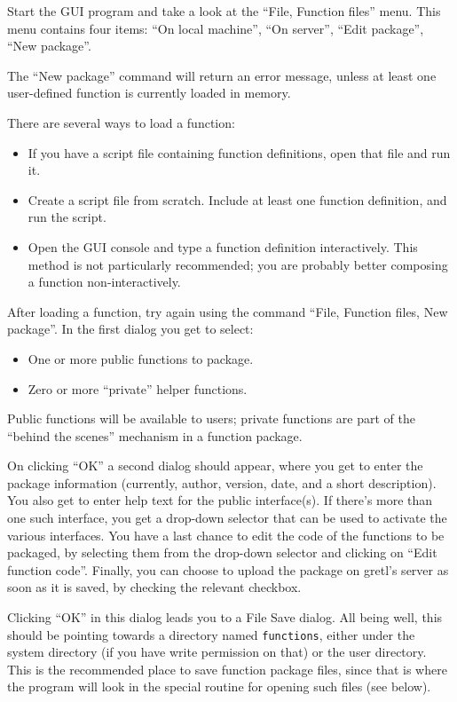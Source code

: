 Start the GUI program and take a look at the ``File, Function files'' menu.
This menu contains four items: ``On local machine'', ``On server'', ``Edit
package'', ``New package''.

The ``New package'' command will return an error message, unless at least one
user-defined function is currently loaded in memory.

There are several ways to load a function:

\begin{itemize}
\item If you have a script file containing function definitions, open
  that file and run it.
\item Create a script file from scratch.  Include at least one
  function definition, and run the script.
\item Open the GUI console and type a function definition
  interactively.  This method is not particularly recommended; you are
  probably better composing a function non-interactively.
\end{itemize}

After loading a function, try again using the command ``File, Function
files, New package''. In the first dialog you get to select:

\begin{itemize}
\item One or more public functions to package.
\item Zero or more ``private'' helper functions.
\end{itemize}

Public functions will be available to users; private functions are
part of the ``behind the scenes'' mechanism in a function package.

On clicking ``OK'' a second dialog should appear, where you get to
enter the package information (currently, author, version, date, and a
short description).  You also get to enter help text for the public
interface(s).  If there's more than one such interface, you get a
drop-down selector that can be used to activate the various interfaces.  
You have a last chance to edit the code of the functions to be
packaged, by selecting them from the drop-down selector and clicking on
``Edit function code''. Finally, you can choose to upload the package on
gretl's server as soon as it is saved, by checking the relevant checkbox.

Clicking ``OK'' in this dialog leads you to a File Save dialog.  All
being well, this should be pointing towards a directory named
\texttt{functions}, either under the  system directory (if
you have write permission on that) or the  user directory.
This is the recommended place to save function package files, since
that is where the program will look in the special routine for opening
such files (see below).

